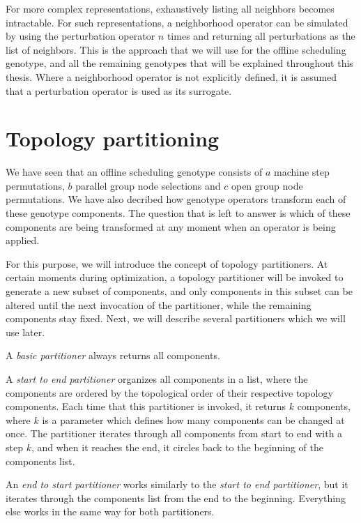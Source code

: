 For more complex representations, exhaustively listing all neighbors becomes intractable. For such representations, a neighborhood operator can be simulated by using the perturbation operator $n$ times and returning all perturbations as the list of neighbors. This is the approach that we will use for the offline scheduling genotype, and all the remaining genotypes that will be explained throughout this thesis. Where a neighborhood operator is not explicitly defined, it is assumed that a perturbation operator is used as its surrogate.

\section{Topology partitioning}
\label{sec:topology_partitioning}

We have seen that an offline scheduling genotype consists of $a$ machine step permutations, $b$ parallel group node selections and $c$ open group node permutations. We have also decribed how genotype operators transform each of these genotype components. The question that is left to answer is which of these components are being transformed at any moment when an operator is being applied.

For this purpose, we will introduce the concept of topology partitioners. At certain moments during optimization, a topology partitioner will be invoked to generate a new subset of components, and only components in this subset can be altered until the next invocation of the partitioner, while the remaining components stay fixed. Next, we will describe several partitioners which we will use later.

A \textit{basic partitioner} always returns all components.

A \textit{start to end partitioner} organizes all components in a list, where the components are ordered by the topological order of their respective topology components. Each time that this partitioner is invoked, it returns $k$ components, where $k$ is a parameter which defines how many components can be changed at once. The partitioner iterates through all components from start to end with a step $k$, and when it reaches the end, it circles back to the beginning of the components list.

An \textit{end to start partitioner} works similarly to the \textit{start to end partitioner}, but it iterates through the components list from the end to the beginning. Everything else works in the same way for both partitioners.

